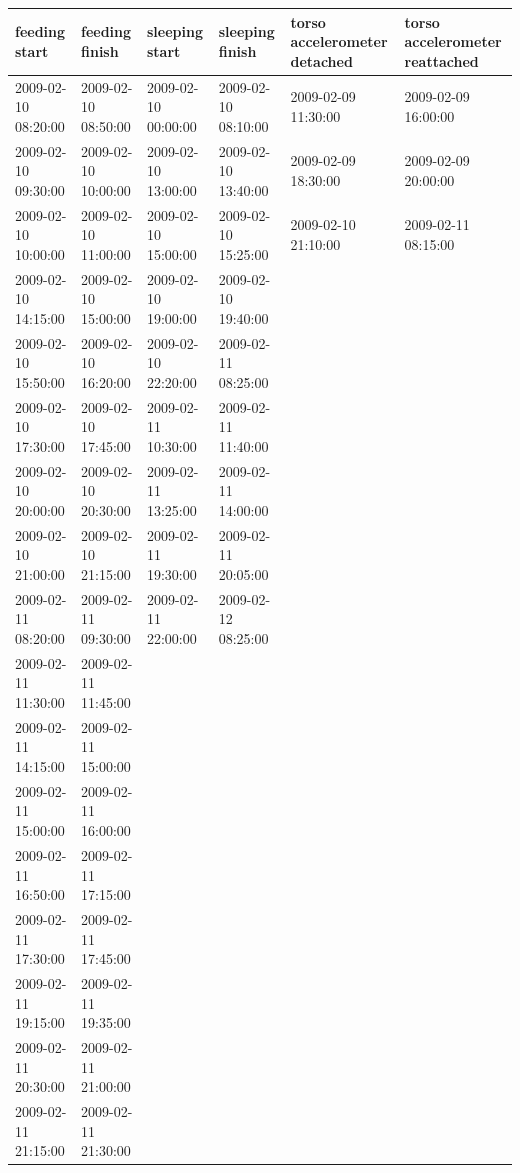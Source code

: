 \documentclass{article}
\begin{document}
{\begin{table}[h]\tiny
\begin{tabular}{|l|l|l|l|l|l|}
\hline
feeding start  & feeding finish & sleeping start & sleeping finish  & torso accelerometer detached & torso accelerometer reattached \\ \hline
2009-02-10 08:20:00 & 2009-02-10 08:50:00 & 2009-02-10 00:00:00 & 2009-02-10 08:10:00 & 2009-02-09 11:30:00 & 2009-02-09 16:00:00 \\ \hline
2009-02-10 09:30:00 & 2009-02-10 10:00:00 & 2009-02-10 13:00:00 & 2009-02-10 13:40:00 & 2009-02-09 18:30:00 & 2009-02-09 20:00:00 \\ \hline
2009-02-10 10:00:00 & 2009-02-10 11:00:00 & 2009-02-10 15:00:00 & 2009-02-10 15:25:00 & 2009-02-10 21:10:00 & 2009-02-11 08:15:00 \\ \hline
2009-02-10 14:15:00 & 2009-02-10 15:00:00 & 2009-02-10 19:00:00 & 2009-02-10 19:40:00 &    &    \\ \hline
2009-02-10 15:50:00 & 2009-02-10 16:20:00 & 2009-02-10 22:20:00 & 2009-02-11 08:25:00 &    &    \\ \hline
2009-02-10 17:30:00 & 2009-02-10 17:45:00 & 2009-02-11 10:30:00 & 2009-02-11 11:40:00 &    &    \\ \hline
2009-02-10 20:00:00 & 2009-02-10 20:30:00 & 2009-02-11 13:25:00 & 2009-02-11 14:00:00 &    &    \\ \hline
2009-02-10 21:00:00 & 2009-02-10 21:15:00 & 2009-02-11 19:30:00 & 2009-02-11 20:05:00 &    &    \\ \hline
2009-02-11 08:20:00 & 2009-02-11 09:30:00 & 2009-02-11 22:00:00 & 2009-02-12 08:25:00 &    &    \\ \hline
2009-02-11 11:30:00 & 2009-02-11 11:45:00 &    &    &    &    \\ \hline
2009-02-11 14:15:00 & 2009-02-11 15:00:00 &    &    &    &    \\ \hline
2009-02-11 15:00:00 & 2009-02-11 16:00:00 &    &    &    &    \\ \hline
2009-02-11 16:50:00 & 2009-02-11 17:15:00 &    &    &    &    \\ \hline
2009-02-11 17:30:00 & 2009-02-11 17:45:00 &    &    &    &    \\ \hline
2009-02-11 19:15:00 & 2009-02-11 19:35:00 &    &    &    &    \\ \hline
2009-02-11 20:30:00 & 2009-02-11 21:00:00 &    &    &    &    \\ \hline
2009-02-11 21:15:00 & 2009-02-11 21:30:00 &    &    &    &    \\ \hline

\end{tabular}
\end{table}}
\end{document}
